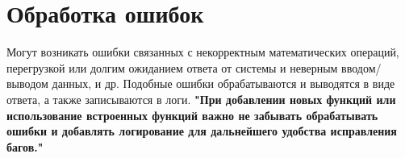 \documentclass[a4paper, 12pt]{report}
\begin{document}
\section{Обработка ошибок}
\textrm{
    Могут возникать ошибки связанных с некорректным математических операций, перегрузкой или долгим ожиданием ответа от системы и неверным вводом/выводом данных, и др. Подобные ошибки обрабатываются и выводятся в виде ответа, а также записываются в логи. \bfseries {"При добавлении новых функций или использование встроенных функций важно не забывать обрабатывать ошибки и добавлять логирование для дальнейшего удобства исправления багов."}
}
\clearpage
\end{document}
